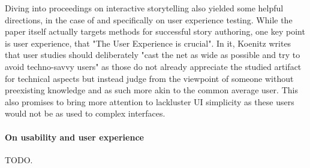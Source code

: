 
Diving into proceedings on interactive storytelling also yielded some helpful directions, in the case of \cite{ISTORY} and \cite{ISTORY1} specifically on user experience testing. While the paper itself actually targets methods for successful story authoring, one key point is user experience, that "The User Experience is crucial". In it, Koenitz writes that user studies should deliberately "cast the net as wide as possible and try to avoid techno-savvy users"\cite[p.~135]{ISTORY} as those do not already appreciate the studied artifact for technical aspects but instead judge from the viewpoint of someone without preexisting knowledge and as such more akin to the common average user. This also promises to bring more attention to lackluster UI simplicity as these users would not be as used to complex interfaces.
\paragraph{On usability and user experience}
TODO.